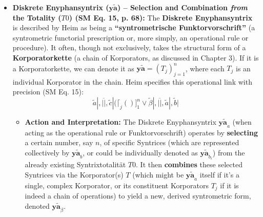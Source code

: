 \documentclass[12pt]{article}
\newcommand{\q}[1]{\enquote{#1}}
\newcommand{\syntrixtotalitaet}{T0}
\newcommand{\diskreteEnyphansyntrix}{\bm{y\widetilde{a}}}
\begin{document}
\begin{itemize}
    \item \textbf{Diskrete Enyphansyntrix (\( \diskreteEnyphansyntrix \)) – Selection and Combination \textit{from} the Totality (\(\syntrixtotalitaet\)) (SM Eq. 15, p. 68):}
    The \textbf{Diskrete Enyphansyntrix} is described by Heim as being a \textbf{\q{syntrometrische Funktorvorschrift}} (a syntrometric functorial prescription or, more simply, an operational rule or procedure). It often, though not exclusively, takes the structural form of a \textbf{Korporatorkette} (a chain of Korporators, as discussed in Chapter 3). If it is a Korporatorkette, we can denote it as \( \diskreteEnyphansyntrix = (T_j)^n_{j=1} \), where each \( T_j \) is an individual Korporator in the chain. Heim specifies this operational link with precision (SM Eq. 15):
    \begin{equation}
\widetilde{a}|, \overline{||}, \widetilde{c}| ( \lceil_j ( ) ]_1^n \vee \widetilde{\beta}|, \overline{||}, \widetilde{a}|, \widetilde{b}|
\label{eq:original_diskrete_enyphansyntrix}
\tag{15}
\end{equation}
    \begin{itemize}
        \item \textbf{Action and Interpretation:} The Diskrete Enyphansyntrix \( \diskreteEnyphansyntrix_a \) (when acting as the operational rule or Funktorvorschrift) operates by \textbf{selecting} a certain number, say \( n \), of specific Syntrices (which are represented collectively by \( \diskreteEnyphansyntrix_b \), or could be individually denoted as \( \diskreteEnyphansyntrix_{b_i} \)) from the already existing Syntrixtotalität \( \syntrixtotalitaet \). It then \textbf{combines} these selected Syntrices via the Korporator(s) \( T \) (which might be \( \diskreteEnyphansyntrix_a \) itself if it's a single, complex Korporator, or its constituent Korporators \( T_j \) if it is indeed a chain of operations) to yield a new, derived syntrometric form, denoted \( \diskreteEnyphansyntrix_\beta \).

\end{itemize}
\end{itemize}
\end{document}
